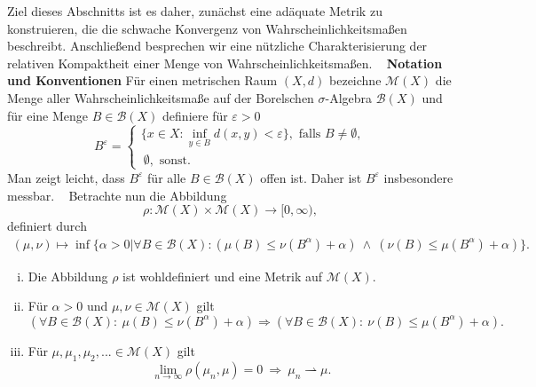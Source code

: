 Ziel dieses Abschnitts ist es daher, zunächst eine adäquate Metrik zu konstruieren, die die schwache Konvergenz von Wahrscheinlichkeitsmaßen beschreibt. 
Anschließend besprechen wir eine nützliche Charakterisierung der relativen Kompaktheit einer Menge von Wahrscheinlichkeitsmaßen. 
\newline \ \newline
\textbf{Notation und Konventionen} \newline 
Für einen metrischen Raum $(X,d)$ bezeichne $\mathcal{M}(X)$ die Menge aller Wahrscheinlichkeitsmaße auf der Borelschen $\sigma$-Algebra $\mathcal{B}(X)$ und für eine Menge $B \in \mathcal{B}(X)$ definiere für $\varepsilon > 0$
$$
    B^{\varepsilon} = \begin{cases}
         \{x \in X: \inf_{y \in B}d(x,y) < \varepsilon\}, \text{ falls } B \neq \emptyset, \\\ 
        \emptyset, \text{ sonst.}
    \end{cases}
$$
Man zeigt leicht, dass $B^{\varepsilon}$ für alle $B\in \mathcal{B}(X)$ offen ist. Daher ist $B^{\varepsilon}$ insbesondere messbar. 
\newline \ \newline 
Betrachte nun die Abbildung 
$$
    \rho: \mathcal{M}(X) \times \mathcal{M}(X) \to [0, \infty),
$$
definiert durch
\begin{align}
    (\mu, \nu) \mapsto \inf\big\{\alpha > 0 | \forall B \in \mathcal{B}(X): (\mu(B) \leq \nu(B^{\alpha}) + \alpha) \ \land \ (\nu(B) \leq \mu(B^{\alpha}) + \alpha) \big\}.
\end{align}
\begin{proposition}
    \begin{enumerate}[(i)]
        \item Die Abbildung $\rho$ ist wohldefiniert und eine Metrik auf $\mathcal{M}(X)$. 
        \item Für $\alpha > 0$ und $\mu, \nu \in \mathcal{M}(X)$ gilt
        $$
            (\forall B \in \mathcal{B}(X): \ \mu(B) \leq \nu(B^{\alpha}) + \alpha) \Rightarrow (\forall B \in \mathcal{B}(X): \ \nu(B) \leq \mu(B^{\alpha}) + \alpha).
        $$
        \item Für $\mu, \mu_1, \mu_2,... \in \mathcal{M}(X)$ gilt 
        $$
            \lim_{n \to \infty} \rho(\mu_n, \mu) = 0 \ \Rightarrow \ \mu_n \rightharpoonup \mu. 
        $$
    \end{enumerate}
\end{proposition}

